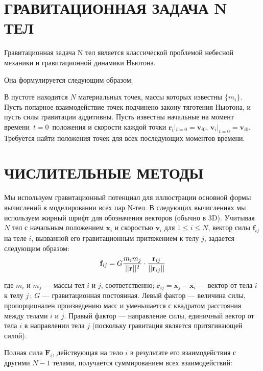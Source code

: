\documentclass{article}
\begin{document}
\tableofcontents
\pagebreak


\pagebreak
\section{ГРАВИТАЦИОННАЯ ЗАДАЧА N ТЕЛ}

Гравитационная задача N тел является классической проблемой небесной механики и гравитационной динамики Ньютона.

Она формулируется следующим образом:

В пустоте находится $N$ материальных точек, массы которых известны $\{m_i\}$. Пусть попарное взаимодействие точек подчинено закону тяготения Ньютона, и пусть силы гравитации аддитивны. Пусть известны начальные на момент времени $\,t=0\,$ положения и скорости каждой точки $\mathbf{r}_i|_{t=0} = \mathbf{v}_{i0},\, \mathbf{v}_i|_{t=0} = \mathbf{v}_{i0}.$ Требуется найти положения точек для всех последующих моментов времени.\\


\pagebreak
\section{ЧИСЛИТЕЛЬНЫЕ МЕТОДЫ}

Мы используем гравитационный потенциал для иллюстрации основной формы вычислений в моделировании всех пар N-тел. В следующих вычислениях мы используем жирный шрифт для обозначения векторов (обычно в 3D). Учитывая $N$ тел с начальным положением $\mathbf{x}_i$ и скоростью $\mathbf{v}_i$ для $ 1 \leqslant i \leqslant N$, вектор силы $\mathbf{f}_{ij}$ на теле $i$, вызванной его гравитационным притяжением к телу $j$, задается следующим образом:\\
$$
\mathbf{f}_{ij} = G\frac{m_im_j}{||\mathbf{r}||^2}\cdot\frac{\mathbf{r}_{ij}}{||\mathbf{r}_{ij}||}\\[\baselineskip]
$$

где $m_i$ и $m_j$ $\text{---}$ массы тел $i$ и $j$, соответственно; $\mathbf{r}_{ij} = \mathbf{x}_j - \mathbf{x}_i$ $\text{---}$ вектор от тела $i$ к телу $j\,$; $G$ $\text{---}$ гравитационная постоянная. Левый фактор --- величина силы, пропорционален произведению масс и уменьшается с квадратом расстояния между телами $i$ и $j$. Правый фактор $\text{---}$ направление силы, единичный вектор от тела $i$ в направлении тела $j$ (поскольку гравитация является притягивающей силой).

Полная сила $\mathbf{F}_i$, действующая на тело $i$ в результате его взаимодействия с другими $N - 1$ телами, получается суммированием всех взаимодействий:
\end{document}
